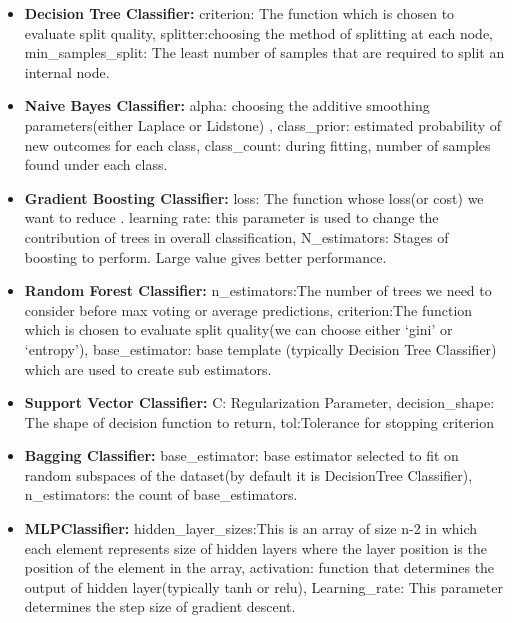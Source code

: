 \renewcommand{\labelitemi}{\textbullet}
\begin{itemize}
    \item \textbf{Decision Tree Classifier:}  criterion: The function which is chosen to evaluate split quality, splitter:choosing the method of splitting at each node, min\_samples\_split: The least number of samples that are required to split an internal node.

    \item \textbf{Naive Bayes Classifier:}  alpha: choosing the additive smoothing parameters(either Laplace or Lidstone) , class\_prior: estimated probability of new outcomes for each class, class\_count: during fitting, number of samples found under each class.

    \item \textbf{Gradient Boosting Classifier:} loss: The function whose loss(or cost) we want to reduce . learning rate: this parameter is used to change the contribution of trees in overall classification, N\_estimators: Stages of boosting to perform. Large value gives better performance.

    \item \textbf{Random Forest Classifier:} n\_estimators:The number of trees we need to consider before max voting or average predictions, criterion:The function which is chosen to evaluate split quality(we can choose either ‘gini’ or ‘entropy’), base\_estimator: base template (typically Decision Tree Classifier) which are used to create sub estimators. 

    \item \textbf{Support Vector Classifier:} C: Regularization Parameter, decision\_shape: The shape of decision function to return, tol:Tolerance for stopping criterion

    \item \textbf{Bagging Classifier:} base\_estimator: base estimator selected to fit on random subspaces of the dataset(by default it is DecisionTree Classifier), n\_estimators: the count of base\_estimators.
    
    \item \textbf{MLPClassifier:} hidden\_layer\_sizes:This is an array of size n-2 in which each element represents size of hidden layers where the layer position is the position of the element in the array, activation: function that determines the output of hidden layer(typically tanh or relu), Learning\_rate: This parameter determines the step size of gradient descent.
\end{itemize}

